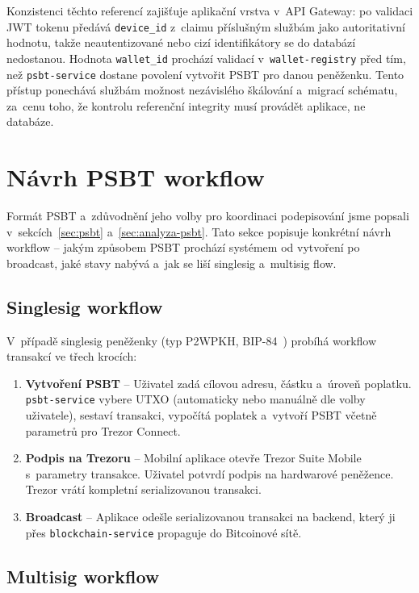 Konzistenci těchto referencí zajišťuje aplikační vrstva v~API Gateway:
po validaci JWT tokenu předává \texttt{device\_id} z~claimu příslušným
službám jako autoritativní hodnotu, takže neautentizované nebo cizí
identifikátory se do databází nedostanou. Hodnota \texttt{wallet\_id}
prochází validací v~\texttt{wallet-registry} před tím, než
\texttt{psbt-service} dostane povolení vytvořit PSBT pro danou peněženku.
Tento přístup ponechává službám možnost nezávislého škálování a~migrací
schématu, za~cenu toho, že kontrolu referenční integrity musí provádět
aplikace, ne databáze.

\section{Návrh PSBT workflow}
\label{sec:psbt-workflow}

Formát PSBT a~zdůvodnění jeho volby pro koordinaci podepisování jsme
popsali v~sekcích~\ref{sec:psbt} a~\ref{sec:analyza-psbt}. Tato sekce
popisuje konkrétní návrh workflow -- jakým způsobem PSBT prochází
systémem od vytvoření po broadcast, jaké stavy nabývá a~jak se liší
singlesig a~multisig flow.

\subsection{Singlesig workflow}

V~případě singlesig peněženky (typ P2WPKH, BIP-84~\cite{BIP84}) probíhá
workflow transakcí ve třech krocích:

\begin{enumerate}
\item \textbf{Vytvoření PSBT} -- Uživatel zadá cílovou adresu, částku
  a~úroveň poplatku. \texttt{psbt-service} vybere UTXO (automaticky nebo
  manuálně dle volby uživatele), sestaví transakci, vypočítá poplatek
  a~vytvoří PSBT včetně parametrů pro Trezor Connect.
\item \textbf{Podpis na Trezoru} -- Mobilní aplikace otevře Trezor Suite
  Mobile s~parametry transakce. Uživatel potvrdí podpis na hardwarové
  peněžence. Trezor vrátí kompletní serializovanou transakci.
\item \textbf{Broadcast} -- Aplikace odešle serializovanou transakci
  na backend, který ji přes \texttt{blockchain-service} propaguje
  do Bitcoinové sítě.
\end{enumerate}

\subsection{Multisig workflow}

